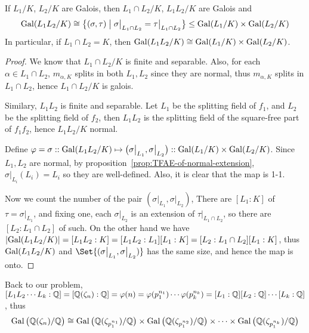 \begin{lemma}
  If $L_1 / K$, $L_2 / K$ are Galois, then $L_1 \cap L_2 / K$, $L_1 L_2 / K$ are Galois and
  \[ \operatorname{Gal}( L_1 L_2 / K) \cong \big\{ (\sigma, \tau) \bigm| \sigma\big|_{L_1 \cap L_2} = \tau\big|_{L_1 \cap L_2} \big\}
    \leq \operatorname{Gal}(L_1 / K) \times \operatorname{Gal}(L_2 / K) \]
  In particular, if $L_1 \cap L_2 = K$, then $\operatorname{Gal}(L_1 L_2 / K) \cong \operatorname{Gal}(L_1 / K) \times \operatorname{Gal}(L_2 / K)$.

  \begin{proof}
    We know that $L_1 \cap L_2 / K$ is finite and separable. Also, for each $\alpha \in L_1 \cap L_2$,
    $m_{\alpha, K}$ splits in both $L_1, L_2$ since they are normal, thus $m_{\alpha, K}$ splits
    in $L_1 \cap L_2$, hence $L_1 \cap L_2 / K$ is galois.

    Similary, $L_1 L_2$ is finite and separable. Let $L_1$ be the splitting field of $f_1$,
    and $L_2$ be the splitting field of $f_2$, then $L_1 L_2$ is the splitting field
    of the square-free part of $f_1 f_2$, hence $L_1 L_2 / K$ normal.

    Define $\varphi = \sigma :: \operatorname{Gal}(L_1 L_2 / K) \mapsto \big( \sigma \big|_{L_1}, \sigma \big|_{L_2} \big)
    :: \operatorname{Gal}(L_1 / K) \times \operatorname{Gal}(L_2 / K)$. Since $L_1, L_2$ are normal,
    by proposition~\ref{prop:TFAE-of-normal-extension}, $\sigma \big|_{L_i}(L_i) = L_i$ so they are well-defined.
    Also, it is clear that the map is 1-1.

    Now we count the number of the pair $(\sigma \big|_{L_1}, \sigma \big|_{L_2})$,
    There are $[L_1: K]$ of $\tau = \sigma \big|_{L_1}$, and fixing one, each $\sigma \big|_{L_2}$
    is an extension of $\tau \big|_{L_1 \cap L_2}$, so there are $[L_2 : L_1 \cap L_2]$ of such.
    On the other hand we have $\lvert\operatorname{Gal}(L_1 L_2 / K)\rvert = [L_1 L_2 : K] = [L_1 L_2 : L_1]
    [L_1 : K] = [L_2 : L_1 \cap L_2] [L_1 : K]$, thus $\operatorname{Gal}(L_1 L_2 / K)$ and
    $\Set{(\sigma \big|_{L_1}, \sigma \big|_{L_2})}$ has the same size, and hence the
    map is onto.
  \end{proof}
\end{lemma}

Back to our problem, $[L_1 L_2 \cdots L_k: \mathbb{Q}] = [\mathbb{Q}(\zeta_n): \mathbb{Q}] = \varphi(n) = \varphi(p_1^{n_1})
\cdots \varphi(p_k^{n_k}) = [L_1 : \mathbb{Q}] [L_2 : \mathbb{Q}] \cdots [L_k : \mathbb{Q}]$, thus
\[ \operatorname{Gal}\big( \mathbb{Q}(\zeta_n) / \mathbb{Q} \big) \cong
  \operatorname{Gal}\big( \mathbb{Q}(\zeta_{p_1^{n_1}}) / \mathbb{Q} \big) \times
  \operatorname{Gal}\big( \mathbb{Q}(\zeta_{p_1^{n_2}}) / \mathbb{Q} \big) \times \cdots \times
  \operatorname{Gal}\big( \mathbb{Q}(\zeta_{p_1^{n_k}}) / \mathbb{Q} \big) \]


